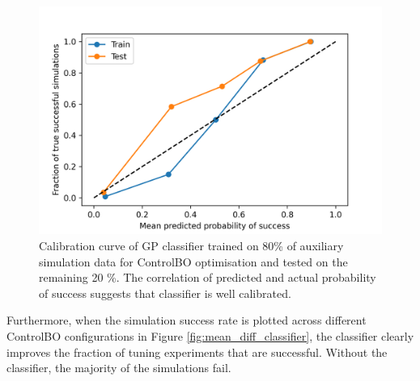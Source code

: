 \begin{figure}
    \centering
    \includegraphics[width=\textwidth]{gfx/Chapter06/classifier_calibration.png}
    \caption{Calibration curve of GP classifier trained on 80\% of auxiliary simulation data for ControlBO optimisation and tested on the remaining 20 \%. The correlation of predicted and actual probability of success suggests that classifier is well calibrated.}
    \label{fig:classifier_calibration}
\end{figure}

Furthermore, when the simulation success rate is plotted across different ControlBO configurations in Figure \ref{fig:mean_diff_classifier}, the classifier clearly improves the fraction of tuning experiments that are successful. Without the classifier, the majority of the simulations fail.  

